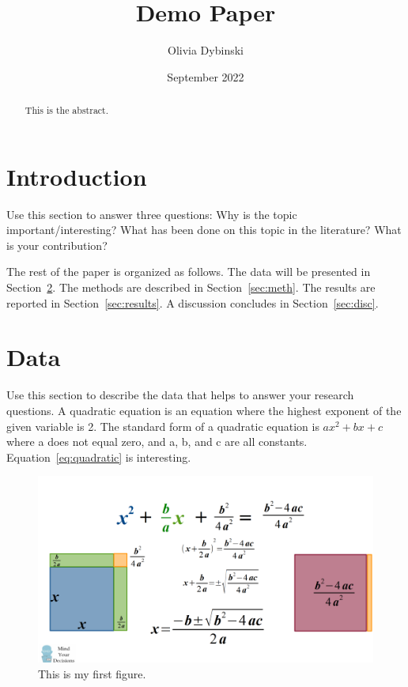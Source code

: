 \documentclass[12pt]{article}
\title{Demo Paper}
\author{Olivia Dybinski\\}
\date{September 2022}
\begin{document}
 \maketitle

 \begin{abstract}
This is the abstract. 
 \end{abstract}


 \section{Introduction} 
 \label{sec:intro}

 Use this section to answer three questions:
 Why is the topic important/interesting?
 What has been done on this topic in the literature?
 What is your contribution?


 The rest of the paper is organized as follows.
 The data will be presented in Section~\ref{sec:data}.
 The methods are described in Section~\ref{sec:meth}.
 The results are reported in Section~\ref{sec:results}.
 A discussion concludes in Section~\ref{sec:disc}.

 \lipsum[1-2]

 \section{Data}
 \label{sec:data}

 Use this section to describe the data that helps to answer your research questions.
 A quadratic equation is an equation where the highest exponent of the given variable is 2. The standard form of a quadratic equation is $ax^2 + bx +c$ where a does not equal zero, and a, b, and c are all constants. Equation~\eqref{eq:quadratic} is interesting. \citep{Dictionary}

 \begin{figure}[h!]
    \centering
    \includegraphics[width=10 cm]{quadraticform.png}
    \caption{This is my first figure.}
    \label{fig:Quadratic Formula}
  \end{figure}
\end{document}
